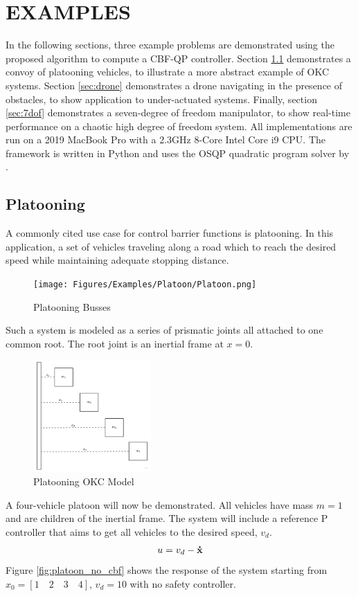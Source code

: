 \chapter{EXAMPLES} \label{chap:examples}
In the following sections, three example problems are demonstrated using the proposed algorithm to compute a CBF-QP controller. Section \ref{sec:platooning} demonstrates a convoy of platooning vehicles, to illustrate a more abstract example of OKC systems. Section \ref{sec:drone} demonstrates a drone navigating in the presence of obstacles, to show application to under-actuated systems. Finally, section \ref{sec:7dof} demonstrates a seven-degree of freedom manipulator, to show real-time performance on a chaotic high degree of freedom system. All implementations are run on a 2019 MacBook Pro with a 2.3GHz 8-Core Intel Core i9 CPU. The framework is written in Python and uses the OSQP quadratic program solver by \cite{osqp}.



\section{Platooning} \label{sec:platooning}
\noindent A commonly cited use case for control barrier functions is platooning. In this application, a set of vehicles traveling along a road which to reach the desired speed while maintaining adequate stopping distance. 
\begin{figure}[H]
    \centering
    \texttt{[image: Figures/Examples/Platoon/Platoon.png]}
    \caption{Platooning Busses}
    \label{fig:platoon_diag}
\end{figure}
\noindent Such a system is modeled as a series of prismatic joints all attached to one common root. The root joint is an inertial frame at $x=0$.  

\begin{figure}[H]
    \centering
    \includegraphics[width=0.4\textwidth]{Figures/Examples/Platoon/PlatoonNE.png}
    \caption{Platooning OKC Model}
    \label{fig:platoon_diag_2}
\end{figure}
\noindent A four-vehicle platoon will now be demonstrated. All vehicles have mass $m = 1$ and are children of the inertial frame.  The system will include a reference P controller that aims to get all vehicles to the desired speed, $v_d$.
\begin{align} \label{eqn:platoon_reference}
    u = v_d - {\mathbf{\dot{x}}}
\end{align}
\noindent Figure \ref{fig:platoon_no_cbf} shows the response of the system starting from $x_0 = [1 \quad 2 \quad 3 \quad 4]$, $v_d = 10$ with no safety controller.

